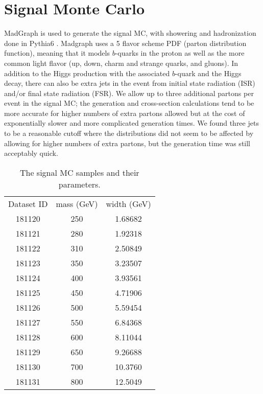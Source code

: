 \section{Signal Monte Carlo}
MadGraph \cite{MadGraph} is used to generate the signal MC, with showering and hadronization done in Pythia6 \cite{Pythia6}.  Madgraph uses a 5 flavor scheme PDF (parton distribution function), meaning that it models $b$-quarks in the proton as well as the more common light flavor (up, down, charm and strange quarks, and gluons).  In addition to the Higgs production with the associated $b$-quark and the Higgs decay, there can also be extra jets in the event from initial state radiation (ISR) and/or final state radiation (FSR).  We allow up to three additional partons per event in the signal MC; the generation and cross-section calculations tend to be more accurate for higher numbers of extra partons allowed but at the cost of exponentially slower and more complicated generation times.  We found three jets to be a reasonable cutoff where the distributions did not seem to be affected by allowing for higher numbers of extra partons, but the generation time was still acceptably quick.  

\begin{table}
   \caption{The signal MC samples and their parameters. \label{tab:sig_mc_parameters} }
    \begin{tabular}{ c c c }
    Dataset ID & mass (GeV) & width (GeV) \\
    181120     & 250        & 1.68682 \\
    181121     & 280        & 1.92318 \\
    181122     & 310        & 2.50849 \\
    181123     & 350        & 3.23507 \\
    181124     & 400        & 3.93561 \\
    181125     & 450        & 4.71906 \\
    181126     & 500        & 5.59454 \\
    181127     & 550        & 6.84368 \\
    181128     & 600        & 8.11044 \\
    181129     & 650        & 9.26688 \\
    181130     & 700        & 10.3760 \\
    181131     & 800        & 12.5049 \\
    \end{tabular}
\end{table}

